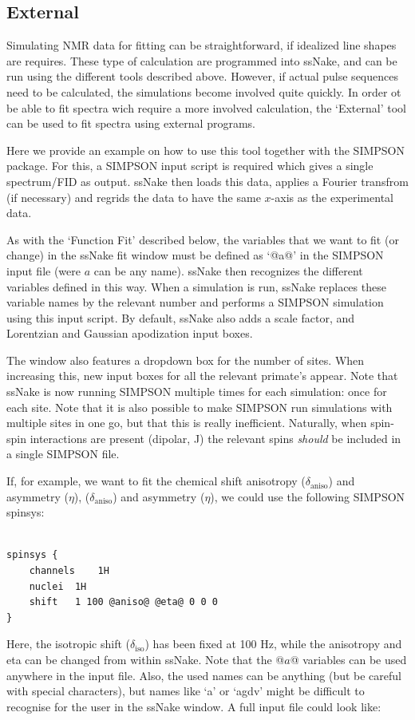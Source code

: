 \documentclass[11pt,a4paper]{article}
\begin{document}
\subsection{External}
Simulating NMR data for fitting can be straightforward, if idealized line shapes are requires. These
type of calculation are programmed into ssNake, and can be run using the different tools described
above. However, if actual pulse sequences need to be calculated, the simulations become involved
quite quickly. In order ot be able to fit spectra wich require a more involved calculation, the
`External' tool can be used to fit spectra using external programs.


Here we provide an example on how to use this tool together with the SIMPSON package\cite{Bak2000SIMPSON,Tosner2014Computer,Tosner2009Optimal}.
For this, a SIMPSON input script is
required which gives a single spectrum/FID as output. ssNake then loads this data, applies a Fourier
transfrom (if necessary) and regrids the data to have the same $x$-axis as the experimental data.

As with the `Function Fit' described below, the variables that we want to fit (or change) in the
ssNake fit window must be defined as `@a@' in the SIMPSON input file (were $a$ can be any name). ssNake
then recognizes the different variables defined in this way. When a simulation is run, ssNake
replaces these variable names by the relevant number and performs a SIMPSON simulation using this
input script. By default, ssNake also adds a scale factor, and Lorentzian and Gaussian apodization
input boxes.

The window also features a dropdown box for the number of sites. When increasing this, new input
boxes for all the relevant primate's appear. Note that ssNake is now running SIMPSON multiple times
for each simulation: once for each site. Note that it is also possible to make SIMPSON run
simulations with multiple sites in one go, but that this is really inefficient. Naturally, when
spin-spin interactions are present (dipolar, J) the relevant spins \textit{should} be included in a single
SIMPSON file.


If, for example, we want to fit the chemical shift anisotropy ($\delta_\text{aniso}$) and asymmetry ($\eta$), 
($\delta_\text{aniso}$) and asymmetry ($\eta$), we could use the following SIMPSON spinsys:

\lstset{language=tcl}          %

\begin{lstlisting}[frame=single]  % Start your code-block

spinsys {
    channels	1H
    nuclei	1H
    shift	1 100 @aniso@ @eta@ 0 0 0
}
\end{lstlisting}
Here, the isotropic shift ($\delta_\text{iso}$) has been fixed at 100 Hz, while the anisotropy and
eta can be changed from within ssNake. Note that the @$a$@ variables can be used anywhere in the
input file. Also, the used names can be anything (but be careful with special characters), but names
like `a' or `agdv' might be difficult to recognise for the user in the ssNake window.
A full input file could look like:
\end{document}
